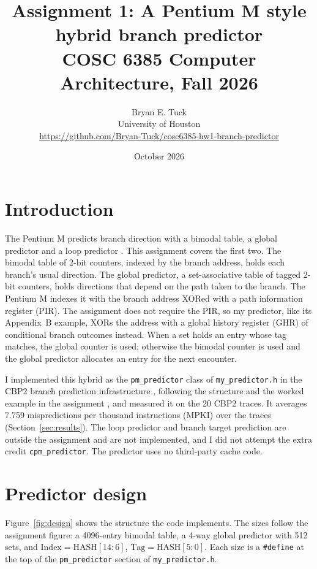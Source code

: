 \documentclass[11pt]{article}
\title{Assignment 1: A Pentium M style hybrid branch predictor\\
  \large COSC 6385 Computer Architecture, Fall 2026}
\author{Bryan E. Tuck\\University of Houston\\{\small \url{https://github.com/Bryan-Tuck/cosc6385-hw1-branch-predictor}}}
\date{October 2026}
\newcommand{\code}[1]{\texttt{#1}}
\begin{document}
\maketitle

\section{Introduction}

The Pentium M predicts branch direction with a bimodal table, a global predictor and a loop
predictor \cite{uzelac2009}. This assignment covers the first two. The bimodal table of 2-bit
counters, indexed by the branch address, holds each branch's usual direction. The global
predictor, a set-associative table of tagged 2-bit counters, holds directions that depend on
the path taken to the branch. The Pentium M indexes it with the branch address XORed with a
path information register (PIR). The assignment does not require the PIR, so my predictor,
like its Appendix~B example, XORs the address with a global history register (GHR) of
conditional branch outcomes instead. When a set holds an entry whose tag matches, the global counter is
used; otherwise the bimodal counter is used and the global predictor allocates an entry for
the next encounter.

I implemented this hybrid as the \code{pm\_predictor} class of \code{my\_predictor.h} in the CBP2
branch prediction infrastructure \cite{jimenez2006}, following the structure and the worked
example in the assignment \cite{assignment}, and measured it on the 20 CBP2 traces. It averages
7.759 mispredictions per thousand instructions (MPKI) over the traces (Section~\ref{sec:results}).
The loop predictor and branch target prediction are outside the assignment and are not implemented,
and I did not attempt the extra credit \code{cpm\_predictor}. The predictor uses no third-party
cache code.

\section{Predictor design}

Figure~\ref{fig:design} shows the structure the code implements. The sizes follow the assignment
figure: a 4096-entry bimodal table, a 4-way global predictor with 512 sets, and
$\mathrm{Index} = \mathrm{HASH}[14{:}6]$, $\mathrm{Tag} = \mathrm{HASH}[5{:}0]$. Each size is a
\code{\#define} at the top of the \code{pm\_predictor} section of \code{my\_predictor.h}.
\end{document}
